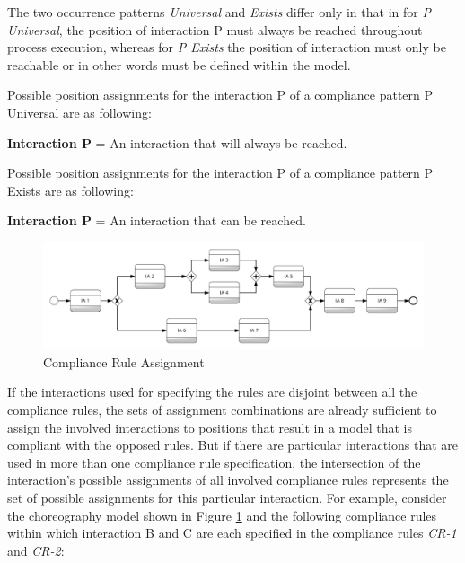 The two occurrence patterns \textit{Universal} and \textit{Exists} differ only in that in for \textit{P Universal}, the position of interaction P must always be reached throughout process execution, whereas for \textit{P Exists} the position of interaction must only be reachable or in other words must be defined within the model.

\begin{Def}
	Possible position assignments for the interaction P of a compliance pattern P Universal are as following:
	\begin{center}
		\textbf{Interaction P} = An interaction that will always be reached.\\
	\end{center}
	\label{def:universal}
\end{Def}

\begin{Def}
	Possible position assignments for the interaction P of a compliance pattern P Exists are as following:
	\begin{center}
		\textbf{Interaction P} = An interaction that can be reached.\\
	\end{center}
	\label{def:exists}
\end{Def}

\begin{figure}[H]
\includegraphics[width=1\textwidth]{src/images/cr_assign.png}
\caption{Compliance Rule Assignment}
\label{fig:crassign}
\end{figure}

If the interactions used for specifying the rules are disjoint between all the compliance rules, the sets of assignment combinations are already sufficient to assign the involved interactions to positions that result in a model that is compliant with the opposed rules. But if there are particular interactions that are used in more than one compliance rule specification, the intersection of the interaction's possible assignments of all involved compliance rules represents the set of possible assignments for this particular interaction. For example, consider the choreography model shown in Figure \ref{fig:crassign} and the following compliance rules within which interaction B and C are each specified in the compliance rules \textit{CR-1} and \textit{CR-2}:

